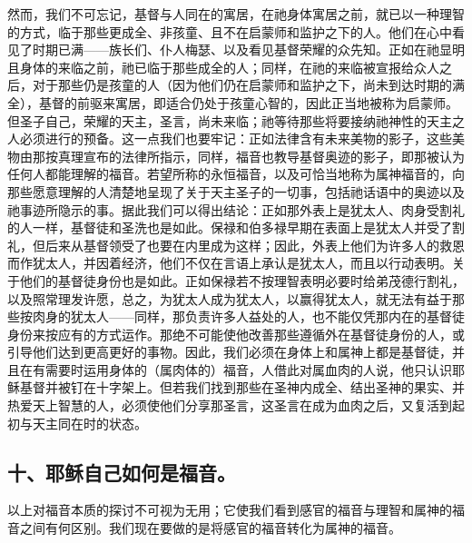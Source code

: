 然而，我们不可忘记，基督与人同在的寓居，在祂身体寓居之前，就已以一种理智的方式，临于那些更成全、非孩童、且不在启蒙师和监护之下的人。他们在心中看见了时期已满——族长们、仆人梅瑟、以及看见基督荣耀的众先知。正如在祂显明且身体的来临之前，祂已临于那些成全的人；同样，在祂的来临被宣报给众人之后，对于那些仍是孩童的人（因为他们仍在启蒙师和监护之下，尚未到达时期的满全），基督的前驱来寓居，即适合仍处于孩童心智的，因此正当地被称为启蒙师。但圣子自己，荣耀的天主，圣言，尚未来临；祂等待那些将要接纳祂神性的天主之人必须进行的预备。这一点我们也要牢记：正如法律含有未来美物的影子，这些美物由那按真理宣布的法律所指示，同样，福音也教导基督奥迹的影子，即那被认为任何人都能理解的福音。若望所称的永恒福音，以及可恰当地称为属神福音的，向那些愿意理解的人清楚地呈现了关于天主圣子的一切事，包括祂话语中的奥迹以及祂事迹所隐示的事。据此我们可以得出结论：正如那外表上是犹太人、肉身受割礼的人一样，基督徒和圣洗也是如此。保禄和伯多禄早期在表面上是犹太人并受了割礼，但后来从基督领受了也要在内里成为这样；因此，外表上他们为许多人的救恩而作犹太人，并因着经济，他们不仅在言语上承认是犹太人，而且以行动表明。关于他们的基督徒身份也是如此。正如保禄若不按理智表明必要时给弟茂德行割礼，以及照常理发许愿，总之，为犹太人成为犹太人，以赢得犹太人，就无法有益于那些按肉身的犹太人——同样，那负责许多人益处的人，也不能仅凭那内在的基督徒身份来按应有的方式运作。那绝不可能使他改善那些遵循外在基督徒身份的人，或引导他们达到更高更好的事物。因此，我们必须在身体上和属神上都是基督徒，并且在有需要时运用身体的（属肉体的）福音，人借此对属血肉的人说，他只认识耶稣基督并被钉在十字架上。但若我们找到那些在圣神内成全、结出圣神的果实、并热爱天上智慧的人，必须使他们分享那圣言，这圣言在成为血肉之后，又复活到起初与天主同在时的状态。\par


\subsection{十、耶稣自己如何是福音。}

以上对福音本质的探讨不可视为无用；它使我们看到感官的福音与理智和属神的福音之间有何区别。我们现在要做的是将感官的福音转化为属神的福音。\par


